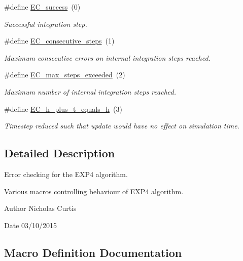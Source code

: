 \begin{DoxyCompactItemize}
\#define \hyperlink{group__exp4cu__ErrCodes_gabd83bc0f9f475a2189a4db4a08b790ca}{E\+C\+\_\+success}~(0)
\begin{DoxyCompactList}\small\item\em Successful integration step. \end{DoxyCompactList}\item 
\#define \hyperlink{group__exp4cu__ErrCodes_gae0287841c08f86f5709660fd731615ad}{E\+C\+\_\+consecutive\+\_\+steps}~(1)
\begin{DoxyCompactList}\small\item\em Maximum consecutive errors on internal integration steps reached. \end{DoxyCompactList}\item 
\#define \hyperlink{group__exp4cu__ErrCodes_ga0f0275d9851ab5c19b79a963d5084df3}{E\+C\+\_\+max\+\_\+steps\+\_\+exceeded}~(2)
\begin{DoxyCompactList}\small\item\em Maximum number of internal integration steps reached. \end{DoxyCompactList}\item 
\#define \hyperlink{group__exp4cu__ErrCodes_ga9326efd544880e2683c4453365ca2704}{E\+C\+\_\+h\+\_\+plus\+\_\+t\+\_\+equals\+\_\+h}~(3)
\begin{DoxyCompactList}\small\item\em Timestep reduced such that update would have no effect on simulation time. \end{DoxyCompactList}\end{DoxyCompactItemize}


\subsection{Detailed Description}
Error checking for the E\+X\+P4 algorithm. 

Various macros controlling behaviour of E\+X\+P4 algorithm.

\begin{DoxyAuthor}{Author}
Nicholas Curtis 
\end{DoxyAuthor}
\begin{DoxyDate}{Date}
03/10/2015 
\end{DoxyDate}


\subsection{Macro Definition Documentation}
